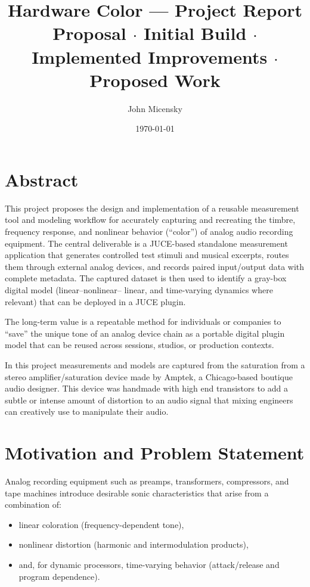 \documentclass[11pt, letterpaper]{article}
\title{\textbf{Hardware Color — Project Report}\\[4pt]
       \large Proposal $\cdot$ Initial Build $\cdot$ Implemented Improvements $\cdot$
       Proposed Work}
\author{John Micensky}
\date{\today}
\begin{document}
\maketitle
\tableofcontents
\newpage

\section{Abstract}
\label{sec:abstract}

This project proposes the design and implementation of a reusable measurement tool and modeling
workflow for accurately capturing and recreating the timbre, frequency response, and nonlinear
behavior (``color'') of analog audio recording equipment. The central deliverable is a JUCE-based
standalone measurement application that generates controlled test stimuli and musical excerpts,
routes them through external analog devices, and records paired input/output data with complete
metadata. The captured dataset is then used to identify a gray-box digital model (linear--nonlinear--
linear, and time-varying dynamics where relevant) that can be deployed in a JUCE plugin.

The long-term value is a repeatable method for individuals or companies to ``save'' the unique tone
of an analog device chain as a portable digital plugin model that can be reused across sessions,
studios, or production contexts.

In this project measurements and models are captured from the saturation from a stereo amplifier/saturation device
made by Amptek, a Chicago-based boutique audio designer. This device was handmade with high
end transistors to add a subtle or intense amount of distortion to an audio signal that mixing
engineers can creatively use to manipulate their audio.

\section{Motivation and Problem Statement}
\label{sec:motivation}

Analog recording equipment such as preamps, transformers, compressors, and tape machines introduce desirable sonic characteristics that arise from a combination of:

\begin{itemize}[leftmargin=1.5em]
    \item linear coloration (frequency-dependent tone),
    \item nonlinear distortion (harmonic and intermodulation products),
    \item and, for dynamic processors, time-varying behavior (attack/release and program dependence).
\end{itemize}
\end{document}
